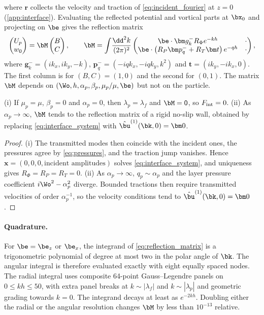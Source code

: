 where $\bm r$ collects the velocity and traction of \cref{eq:incident_fourier} at $z=0$ (\cref{app:interface}).
Evaluating the reflected potential and vortical parts at $\bx_0$ and projecting on $\be$ gives the reflection matrix
\begin{equation}
  \begin{pmatrix}U_p\\ w_0\end{pmatrix}=\bM\begin{pmatrix}B\\ C\end{pmatrix},\qquad
  \bM=\int\!\frac{\dd^2k}{(2\pi)^2}
  \begin{pmatrix}
    \be\cdot\bm g_k^- R_\Phi e^{-kh} & \cdot\\
    \be\cdot\left(R_P\bm p_q^-+R_T\bm t\right)e^{-qh} & \cdot
  \end{pmatrix},
  \label{eq:reflection_matrix}
\end{equation}
where $\bm g_k^-=(ik_x,ik_y,-k)$, $\bm p_q^-=(-iqk_x,-iqk_y,k^2)$ and $\bm t=(ik_y,-ik_x,0)$. The first column is for
$(B,C)=(1,0)$ and the second for $(0,1)$. The matrix $\bM$ depends on $(\Wo,h,\alpha_p,\beta_p,\mu_p/\mu,\be)$ but not on
the particle.

\begin{proposition}\label{prop:limits}
(i) If $\mu_p=\mu$, $\beta_p=0$ and $\alpha_p=0$, then $\lambda_p=\lambda_f$ and $\bM=\mathsf 0$, so $F_{\rm int}=0$.
(ii) As $\alpha_p\to\infty$, $\bM$ tends to the reflection matrix of a rigid no-slip wall, obtained by replacing
\cref{eq:interface_system} with $\hat\bu^{(1)}(\bk,0)=\bm 0$.
\end{proposition}
\begin{proof}
(i) The transmitted modes then coincide with the incident ones, the pressures agree by \cref{eq:pressures}, and the
traction jump vanishes. Hence $\bm x=(0,0,0,\text{incident amplitudes})$ solves \cref{eq:interface_system}, and
uniqueness gives $R_\Phi=R_P=R_T=0$. (ii) As $\alpha_p\to\infty$, $q_p\sim\alpha_p$ and the layer pressure coefficient
$i\Wo^2-\alpha_p^2$ diverge. Bounded tractions then require transmitted velocities of order $\alpha_p^{-1}$, so the
velocity conditions tend to $\hat\bu^{(1)}(\bk,0)=\bm 0$.
\end{proof}

\paragraph*{Quadrature.} For $\be=\be_z$ or $\be_x$, the integrand of \cref{eq:reflection_matrix} is a trigonometric
polynomial of degree at most two in the polar angle of $\bk$. The angular integral is therefore evaluated exactly with
eight equally spaced nodes. The radial integral uses composite 64-point Gauss--Legendre panels on
$0\le kh\le50$, with extra panel breaks at $k\sim|\lambda_f|$ and $k\sim|\lambda_p|$ and geometric grading towards
$k=0$. The integrand decays at least as $e^{-2kh}$. Doubling either the radial or the angular resolution changes
$\bM$ by less than $10^{-13}$ relative.


